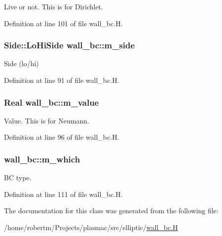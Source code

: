 Live or not. This is for Dirichlet. 



Definition at line 101 of file wall\+\_\+bc.\+H.

\subsubsection[{\texorpdfstring{m\+\_\+side}{m_side}}]{\setlength{\rightskip}{0pt plus 5cm}Side\+::\+Lo\+Hi\+Side wall\+\_\+bc\+::m\+\_\+side\hspace{0.3cm}{\ttfamily [protected]}}\hypertarget{classwall__bc_a340501f2dce2b3161dc734209d0b6c33}{}\label{classwall__bc_a340501f2dce2b3161dc734209d0b6c33}


Side (lo/hi) 



Definition at line 91 of file wall\+\_\+bc.\+H.

\subsubsection[{\texorpdfstring{m\+\_\+value}{m_value}}]{\setlength{\rightskip}{0pt plus 5cm}Real wall\+\_\+bc\+::m\+\_\+value\hspace{0.3cm}{\ttfamily [protected]}}\hypertarget{classwall__bc_a9bddac65830de0c43950d9a0499084ea}{}\label{classwall__bc_a9bddac65830de0c43950d9a0499084ea}


Value. This is for Neumann. 



Definition at line 96 of file wall\+\_\+bc.\+H.

\subsubsection[{\texorpdfstring{m\+\_\+which}{m_which}}]{ wall\+\_\+bc\+::m\+\_\+which\hspace{0.3cm}{\ttfamily [protected]}}\hypertarget{classwall__bc_a2feb06799222d5a01407fd273dffaf26}{}\label{classwall__bc_a2feb06799222d5a01407fd273dffaf26}


BC type. 



Definition at line 111 of file wall\+\_\+bc.\+H.



The documentation for this class was generated from the following file\+:\begin{DoxyCompactItemize}
\item 
/home/robertm/\+Projects/plasmac/src/elliptic/\hyperlink{wall__bc_8H}{wall\+\_\+bc.\+H}\end{DoxyCompactItemize}
